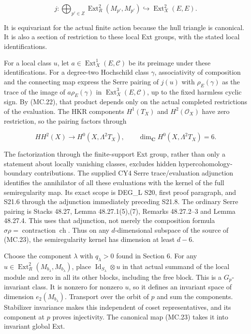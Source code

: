 \[
 j:\bigoplus_{p'\in Z}
          \operatorname{Ext}^2_R(M_{p'},M_{p'})
       \hookrightarrow\operatorname{Ext}^2_X(E,E).
 \tag{MC.23}
\]

It is equivariant for the actual finite action because the hull triangle
is canonical. It is also a section of restriction to these local Ext
groups, with the stated local identifications.

For a local class \(u\), let \(a\in\operatorname{Ext}^1_X(E,\mathcal C)\)
be its preimage under these identifications. For a degree-two Hochschild
class \(\gamma\), associativity of composition and the connecting
map express the Serre pairing of \(j(u)\) with \(\rho_E(\gamma)\)
as the trace of the image of \(a\rho_E(\gamma)\) in
\(\operatorname{Ext}^3_X(E,\mathcal C)\), up to the fixed harmless
cyclic sign. By (MC.22), that product depends only on the actual
completed restrictions of the evaluation. The HKR components
\(H^1(T_X)\) and \(H^2(\mathcal O_X)\) have zero restriction,
so the pairing factors through

\[
 HH^2(X)\longrightarrow H^0(X,\Lambda^2T_X),
 \qquad \dim_{\mathbf C}H^0(X,\Lambda^2T_X)=6.
 \tag{MC.24}
\]

The factorization through the finite-support Ext group, rather than
only a statement about locally vanishing classes, excludes hidden
hypercohomology-boundary contributions. The supplied CY4 Serre
trace/evaluation adjunction identifies the annihilator of all these
evaluations with the kernel of the full semiregularity map. Its exact
scope is DEG\_L S20, first proof paragraph, and S21.6 through the
adjunction immediately preceding S21.8. The ordinary Serre pairing is
Stacks 48.27, Lemma 48.27.1(5),(7), Remarks 48.27.2--3 and Lemma 48.27.4.\cite{SFStacksE846Duality}
This uses that adjunction, not merely the composition formula
\(\sigma\rho=\operatorname{contraction}\operatorname{ch}\).
Thus on any \(d\)-dimensional subspace of the source of (MC.23),
the semiregularity kernel has dimension at least \(d-6\).

Choose the component \(\lambda\) with \(q_\lambda>0\) found in
Section 6. For any
\(u\in\operatorname{Ext}^2_R(M_{b_\lambda},M_{b_\lambda})\),
place \(\operatorname{Id}_{S_\lambda}\otimes u\) in that actual
summand of the local module and zero in all its other blocks, including
the free block. This is a \(G_p\)-invariant class. It is nonzero for
nonzero \(u\), so it defines an invariant space of dimension
\(e_2(M_{b_\lambda})\). Transport over the orbit of \(p\) and sum
the components. Stabilizer invariance makes this independent of coset
representatives, and its component at \(p\) proves injectivity.
The canonical map (MC.23) takes it into invariant global Ext.

